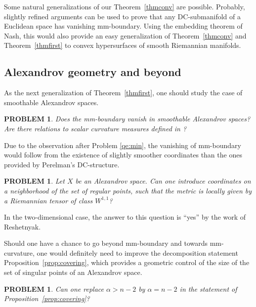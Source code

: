\documentclass[12pt,leqno,intlimits]{amsart}
\numberwithin{equation}{section}
\newtheorem{quest}[thm]{PROBLEM}
\theoremstyle{definition}
\theoremstyle{remark}
\newcommand{\tref}[1]{Theorem~\ref{#1}}
\newcommand{\pref}[1]{Proposition~\ref{#1}}
\begin{document}
Some natural generalizations of our \tref{thmconv} are possible. Probably, slightly refined arguments can be used to
prove that any DC-submanifold of a Euclidean space has vanishing mm-boundary. Using the embedding theorem of Nash, this would also provide an easy generalization of \tref{thmconv} and \tref{thmfirst} to convex hypersurfaces of smooth Riemannian manifolds.

\subsection{Alexandrov geometry and beyond}
As the next generalization of \tref{thmfirst}, one should study the case of smoothable Alexandrov spaces.

\begin{quest}
Does the mm-boundary vanish in smoothable Alexandrov spaces? Are there relations to scalar curvature measures defined in \cite{LP}?
\end{quest}

Due to the observation after Problem \ref{qe:min}, the vanishing of mm-boundary would follow from the existence of slightly smoother coordinates than the ones provided by Perelman's DC-structure.
\begin{quest}
Let $X$ be an Alexandrov space. Can one introduce coordinates on a neighborhood of the set of regular points, such that the metric is locally given by a Riemannian tensor of class $W^{1,1}$?
\end{quest}
In the two-dimensional case, the answer to this question is ``yes'' by the work of Reshetnyak.


Should one have a chance to go beyond mm-boundary and towards mm-curvature, one would definitely need to improve the
decomposition statement \pref{prop:covering}, which provides a geometric control of the size of the set of singular points of an Alexandrov space.

\begin{quest} \label{qe:control}
Can one replace $\alpha>n-2$ by $\alpha=n-2$ in the statement of \pref{prop:covering}?
\end{quest}
\end{document}
